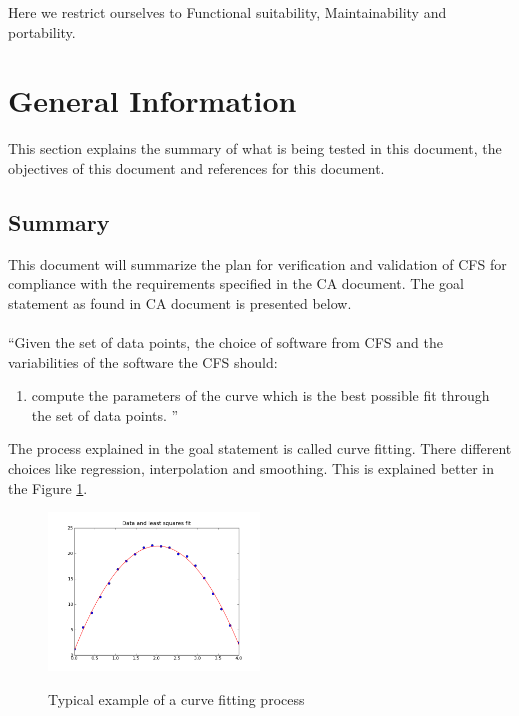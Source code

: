 \documentclass[12pt, titlepage]{article}
\newcommand{\famname}{CFS} %
\begin{document}
Here we restrict ourselves to Functional suitability, Maintainability and portability. 


\section{General Information}

This section explains the summary of what is being tested in this document, the objectives of this document and references for this document. 


\subsection{Summary}

This document will summarize the plan for verification and validation of \famname{} for compliance with the requirements specified in the CA document. 
The goal statement as found in CA document is presented below.
\\
\\
\noindent ``Given the set of data points, the choice of software from \famname{} and the variabilities of the software the \famname{} should:

\begin{enumerate}
	
	\item compute the parameters of the curve which is the best possible fit through the set of data points.	''
\end{enumerate}

The process explained in the goal statement is called curve fitting. There different choices like regression, interpolation and smoothing. This is explained better in the Figure \ref{Fig_CurveFitEg}.

\begin{figure}[h!]
	\begin{center}
		{
			\includegraphics[width=0.5\textwidth]{lstsq11.png}
		}
		\caption{\label{Fig_CurveFitEg} Typical example of a curve fitting process}
	\end{center}
\end{figure}
\end{document}
